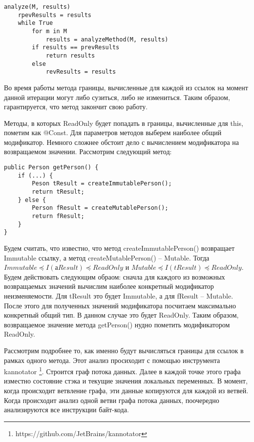 \begin{lstlisting}[caption=Анализ модификаторов изменяемости для методов, label=code:mutability]
analyze(M, results)
	rpevResults = results    
    while True 
        for m in M 
			results = analyzeMethod(M, results)
        if results == prevResults 
        	return results        
        else 
            revResults = results
\end{lstlisting}

Во время работы метода границы, вычисленные для каждой из ссылок на момент данной итерации могут либо сузиться, либо не измениться. Таким образом, гарантируется, что метод закончит свою работу.

Методы, в которых ReadOnly будет попадать в границы, вычисленные для this, пометим как @Const. Для параметров методов выберем наиболее общий модификатор. Немного сложнее обстоит дело с вычислением модификатора на возвращаемом значении. Рассмотрим следующий метод:

\begin{lstlisting}[caption=Вывод модификатора неизменяемости для возвращаемого методом значения, label=code:return_value_analyze]
public Person getPerson() {
    if (...) {
        Peson tResult = createImmutablePerson();
        return tResult;
    } else {
        Person fResult = createMutablePerson();
        return fResult;
    } 
} 
\end{lstlisting}

Будем считать, что известно, что метод createImmutablePerson() возвращает Immutable ссылку, а метод createMutablePerson() -- Mutable. Тогда $Immutable \preceq I(аResult) \preceq ReadOnly$ и $Mutable \preceq I(tResult) \preceq ReadOnly$. Будем действовать следующим обраом: сначла для каждого из возможных возвращаемых значений вычислим наиболее конкретный модификатор неизменяемости. Для tResult это будет Immutable, а для fResult -- Mutable. После этого для полученных значений модификатора посчитаем максимально конкретный общий тип. В данном случае это будет ReadOnly. Таким образом, возвращаемое значение метода getPerson() нудно пометить модификатором ReadOnly. 

Рассмотрим подробнее то, как именно будут вычисляться границы для ссылок в рамках одного метода. Этот анализ просиходит с помощью инструмента kannotator \footnote{https://github.com/JetBrains/kannotator}. Строится граф потока данных. Далее в каждой точке этого графа изместно состояние стэка и текущие значения локальных переменных. В момент, когда происходит ветвление графа, эти данные копируются для каждой из ветвей. Когда происходит анализ одной ветви графа потока данных, поочередно анализируются все инструкции байт-кода. 

